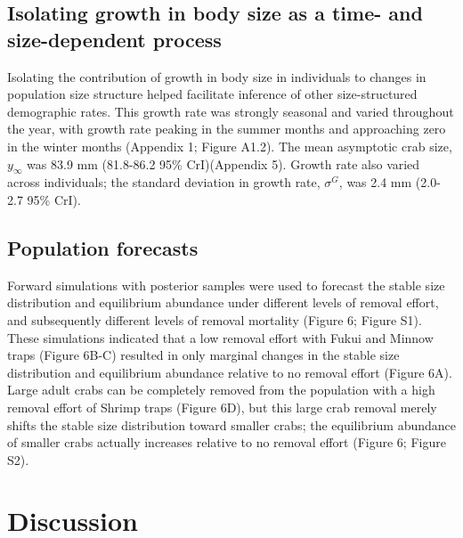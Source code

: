\documentclass{article}
\begin{document}
\subsection{Isolating growth in body size as a time- and size-dependent process}

Isolating the contribution of growth in body size in individuals to changes in population size structure helped facilitate inference of other size-structured demographic rates. This growth rate was strongly seasonal and varied throughout the year, with growth rate peaking in the summer months and approaching zero in the winter months (Appendix 1; Figure A1.2). The mean asymptotic crab size, $y_{\infty}$ was 83.9 mm (81.8-86.2 95\% CrI)(Appendix 5). Growth rate also varied across individuals;  the standard deviation in growth rate, $\sigma^G$, was 2.4 mm (2.0-2.7 95\% CrI).

\subsection{Population forecasts}

Forward simulations with posterior samples were used to forecast the stable size distribution and equilibrium abundance under different levels of removal effort, and subsequently different levels of removal mortality (Figure 6; Figure S1). These simulations indicated that a low removal effort with Fukui and Minnow traps (Figure 6B-C) resulted in only marginal changes in the stable size distribution and equilibrium abundance relative to no removal effort (Figure 6A). Large adult crabs can be completely removed from the population with a high removal effort of Shrimp traps (Figure 6D), but this large crab removal merely shifts the stable size distribution toward smaller crabs; the equilibrium abundance of smaller crabs actually increases relative to no removal effort (Figure 6; Figure S2).

\section{Discussion}
\end{document}
